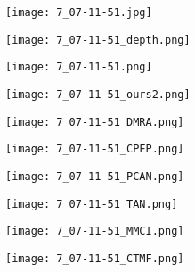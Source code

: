 \documentclass[runningheads]{llncs}
\begin{document}
\begin{figure}[t]
	\begin{subfigure}[t]{1.13cm}
		\centering
		\texttt{[image: 7\_07-11-51.jpg]}
	\end{subfigure}
	\begin{subfigure}[t]{1.13cm}
		\centering
		\texttt{[image: 7\_07-11-51\_depth.png]}
	\end{subfigure}
	\begin{subfigure}[t]{1.13cm}
		\centering
		\texttt{[image: 7\_07-11-51.png]}
	\end{subfigure}
	\begin{subfigure}[t]{1.13cm}
		\centering
		\texttt{[image: 7\_07-11-51\_ours2.png]}
	\end{subfigure}
	\begin{subfigure}[t]{1.13cm}
		\centering
		\texttt{[image: 7\_07-11-51\_DMRA.png]}
	\end{subfigure}
	\begin{subfigure}[t]{1.13cm}
		\centering
		\texttt{[image: 7\_07-11-51\_CPFP.png]}
	\end{subfigure}
	\begin{subfigure}[t]{1.13cm}
		\centering
		\texttt{[image: 7\_07-11-51\_PCAN.png]}
	\end{subfigure}
	\begin{subfigure}[t]{1.13cm}
		\centering
		\texttt{[image: 7\_07-11-51\_TAN.png]}
	\end{subfigure}
	\begin{subfigure}[t]{1.13cm}
		\centering
		\texttt{[image: 7\_07-11-51\_MMCI.png]}
	\end{subfigure}
	\begin{subfigure}[t]{1.13cm}
		\centering
		\texttt{[image: 7\_07-11-51\_CTMF.png]}
	\end{subfigure}
	
	\vspace{1pt}
	

\end{figure}
\end{document}

